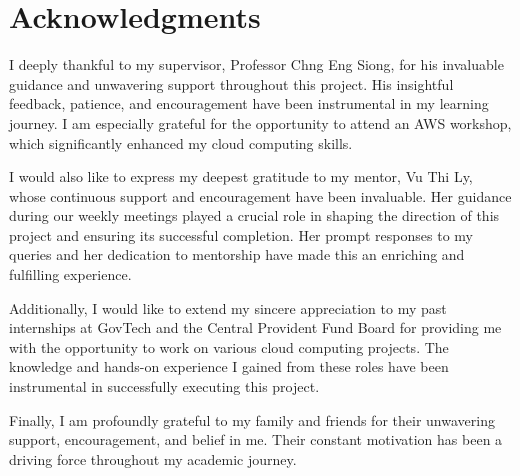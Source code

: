 \chapter*{Acknowledgments}

I deeply thankful to my supervisor, Professor Chng Eng Siong, for his invaluable guidance and unwavering support throughout this project. His insightful feedback, patience, and encouragement have been instrumental in my learning journey. I am especially grateful for the opportunity to attend an AWS workshop, which significantly enhanced my cloud computing skills. 

I would also like to express my deepest gratitude to my mentor, Vu Thi Ly, whose continuous support and encouragement have been invaluable. Her guidance during our weekly meetings played a crucial role in shaping the direction of this project and ensuring its successful completion. Her prompt responses to my queries and her dedication to mentorship have made this an enriching and fulfilling experience.

Additionally, I would like to extend my sincere appreciation to my past internships at GovTech and the Central Provident Fund Board for providing me with the opportunity to work on various cloud computing projects. The knowledge and hands-on experience I gained from these roles have been instrumental in successfully executing this project.

Finally, I am profoundly grateful to my family and friends for their unwavering support, encouragement, and belief in me. Their constant motivation has been a driving force throughout my academic journey.
